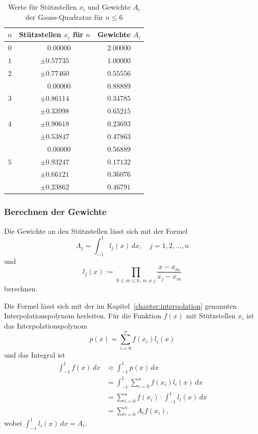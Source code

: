 \begin{table}
    \centering
    \begin{tabular}{|c|c|c|}
        \hline
        $n$ & Stützstellen $x_{i}$ für $n$ & Gewichte $A_{i}$\\
        \hline
        $0$ & $ \phantom{-} 0.00000 $ & $ 2.00000 $ \\
        \hline
        $1$ & $ \pm 0.57735 $ & $ 1.00000 $ \\
        \hline
        $2$ & $ \pm 0.77460 $ & $ 0.55556 $ \\
            & $ \phantom{-} 0.00000 $ & $ 0.88889 $ \\
        \hline
        $3$ & $ \pm 0.86114 $ & $ 0.34785 $ \\
            & $ \pm 0.33998 $ & $ 0.65215 $ \\
        \hline
        $4$ & $ \pm 0.90618 $ & $ 0.23693 $ \\
            & $ \pm 0.53847 $ & $ 0.47863 $ \\
            & $ \phantom{-} 0.00000 $ & $ 0.56889 $ \\
        \hline
        $5$ & $ \pm 0.93247 $ & $ 0.17132 $ \\
            & $ \pm 0.66121 $ & $ 0.36076 $ \\
            & $ \pm 0.23862 $ & $ 0.46791 $ \\
        \hline
    \end{tabular}
    \caption{Werte für Stützstellen $x_{i}$ und Gewichte $A_{i}$ der Gauss-Quadratur für $n \leq 6$
    \label{buch:table:gaussgewichtwerte}}    
\end{table}

\subsubsection{Berechnen der Gewichte}
Die Gewichte an den Stützstellen lässt sich mit der Formel
\begin{equation*}
    A_{j} = \int_{-1}^{1} l_j(x) \, dx, \quad  j = 1, 2, ... , n
\end{equation*}
und 
\begin{equation}
    l_{j}(x) := \prod_{0 \leq m \leq k, \, m \neq j} \frac{x - x_{m}}{x_{j} - x_{m}}
\end{equation}
berechnen.

Die Formel lässt sich mit der im Kapitel~\ref{chapter:interpolation} genannten 
Interpolationspolynom herleiten.
Für die Funktion $f(x)$ mit Stützstellen $x_{i}$ ist das Interpolationspolynom
\begin{equation}
    p(x) = \sum_{i=0}^{n} f(x_{i})l_{i}(x)
\end{equation}
und das Integral ist 
\begin{align}
    \int_{-1}^{1}f(x)\,dx &\approx \int_{-1}^{1}p(x)\,dx \\
    &= \int_{-1}^{1} \sum_{i=0}^{n} f(x_{i}) l_{i}(x) \,dx \\
    &= \sum_{i=0}^{n} f(x_{i}) \cdot \int_{-1}^{1}  l_{i}(x) \,dx \\
    &= \sum_{i=0}^{n} A_{i} f(x_{i}),
\end{align}
wobei $\int_{-1}^{1}  l_{i}(x) \,dx = A_{i}$.

